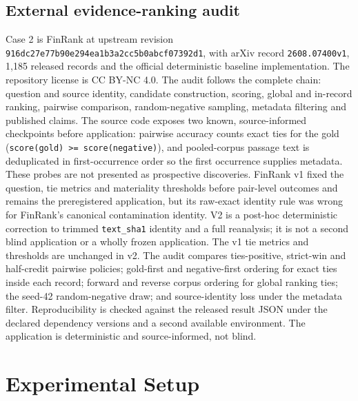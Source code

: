 \documentclass[10pt]{article}
\begin{document}
\subsection{External evidence-ranking audit}
Case 2 is FinRank at upstream revision \texttt{916dc27e77b90e294ea1b3a2cc5b0abcf07392d1}, with arXiv record \texttt{2608.07400v1}, 1,185 released records and the official deterministic baseline implementation. The repository license is CC BY-NC 4.0. The audit follows the complete chain: question and source identity, candidate construction, scoring, global and in-record ranking, pairwise comparison, random-negative sampling, metadata filtering and published claims.
The source code exposes two known, source-informed checkpoints before application: pairwise accuracy counts exact ties for the gold (\texttt{score(gold) >= score(negative)}), and pooled-corpus passage text is deduplicated in first-occurrence order so the first occurrence supplies metadata. These probes are not presented as prospective discoveries. FinRank v1 fixed the question, tie metrics and materiality thresholds before pair-level outcomes and remains the preregistered application, but its raw-exact identity rule was wrong for FinRank's canonical contamination identity. V2 is a post-hoc deterministic correction to trimmed \texttt{text\_sha1} identity and a full reanalysis; it is not a second blind application or a wholly frozen application. The v1 tie metrics and thresholds are unchanged in v2.
The audit compares ties-positive, strict-win and half-credit pairwise policies; gold-first and negative-first ordering for exact ties inside each record; forward and reverse corpus ordering for global ranking ties; the seed-42 random-negative draw; and source-identity loss under the metadata filter. Reproducibility is checked against the released result JSON under the declared dependency versions and a second available environment. The application is deterministic and source-informed, not blind.
\section{Experimental Setup}
\end{document}

